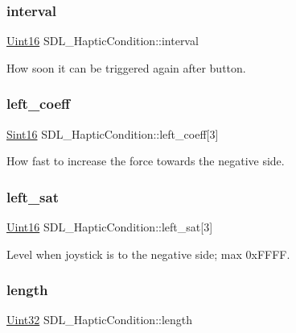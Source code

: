 \subsubsection{\texorpdfstring{interval}{interval}}
{\footnotesize\ttfamily \hyperlink{_s_d_l__stdinc_8h_a31fcc0a076c9068668173ee26d33e42b}{Uint16} S\+D\+L\+\_\+\+Haptic\+Condition\+::interval}

How soon it can be triggered again after button. \mbox{\label{struct_s_d_l___haptic_condition_a2adf52c32f60f0b6826b1e3add2eae7a}} 
\subsubsection{\texorpdfstring{left\+\_\+coeff}{left\_coeff}}
{\footnotesize\ttfamily \hyperlink{_s_d_l__stdinc_8h_a9d0257032c0e146ab6121bf0122712f5}{Sint16} S\+D\+L\+\_\+\+Haptic\+Condition\+::left\+\_\+coeff\mbox{[}3\mbox{]}}

How fast to increase the force towards the negative side. \mbox{\label{struct_s_d_l___haptic_condition_a953448774c40818a4f47c6efea21124d}} 
\subsubsection{\texorpdfstring{left\+\_\+sat}{left\_sat}}
{\footnotesize\ttfamily \hyperlink{_s_d_l__stdinc_8h_a31fcc0a076c9068668173ee26d33e42b}{Uint16} S\+D\+L\+\_\+\+Haptic\+Condition\+::left\+\_\+sat\mbox{[}3\mbox{]}}

Level when joystick is to the negative side; max 0x\+F\+F\+FF. \mbox{\label{struct_s_d_l___haptic_condition_ad0efb0a6ddc20f058e87199eaaa95978}} 
\subsubsection{\texorpdfstring{length}{length}}
{\footnotesize\ttfamily \hyperlink{_s_d_l__stdinc_8h_add440eff171ea5f55cb00c4a9ab8672d}{Uint32} S\+D\+L\+\_\+\+Haptic\+Condition\+::length}

